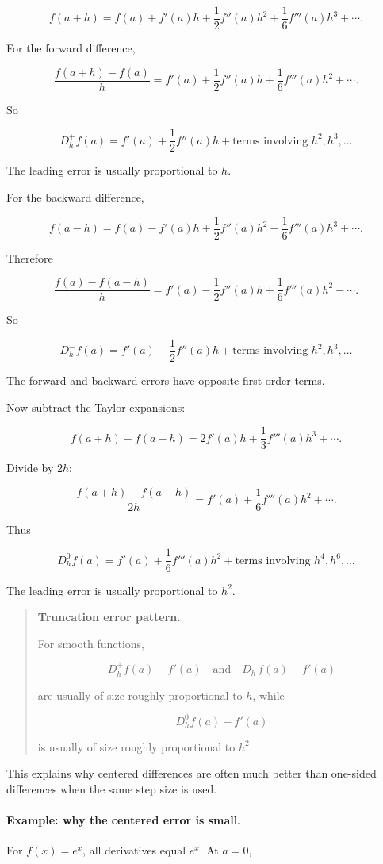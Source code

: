 \[
f(a+h)
=
f(a)+f'(a)h+\frac12f''(a)h^2+\frac16f'''(a)h^3+\cdots.
\]

For the forward difference,

\[
\frac{f(a+h)-f(a)}{h}
=
f'(a)+\frac12f''(a)h+\frac16f'''(a)h^2+\cdots.
\]

So

\[
\boxed{
D_h^+f(a)=f'(a)+\frac12f''(a)h+\text{terms involving }h^2,h^3,\ldots
}
\]

The leading error is usually proportional to \(h\).

For the backward difference,

\[
f(a-h)
=
f(a)-f'(a)h+\frac12f''(a)h^2-\frac16f'''(a)h^3+\cdots.
\]

Therefore

\[
\frac{f(a)-f(a-h)}{h}
=
f'(a)-\frac12f''(a)h+\frac16f'''(a)h^2-\cdots.
\]

So

\[
\boxed{
D_h^-f(a)=f'(a)-\frac12f''(a)h+\text{terms involving }h^2,h^3,\ldots
}
\]

The forward and backward errors have opposite first-order terms.

Now subtract the Taylor expansions:

\[
f(a+h)-f(a-h)
=
2f'(a)h+\frac13f'''(a)h^3+\cdots.
\]

Divide by \(2h\):

\[
\frac{f(a+h)-f(a-h)}{2h}
=
f'(a)+\frac16f'''(a)h^2+\cdots.
\]

Thus

\[
\boxed{
D_h^0f(a)=f'(a)+\frac16f'''(a)h^2+\text{terms involving }h^4,h^6,\ldots
}
\]

The leading error is usually proportional to \(h^2\).

\begin{quote}
\textbf{Truncation error pattern.}

For smooth functions,

\[
D_h^+f(a)-f'(a)
\quad\text{and}\quad
D_h^-f(a)-f'(a)
\]

are usually of size roughly proportional to \(h\), while

\[
D_h^0f(a)-f'(a)
\]

is usually of size roughly proportional to \(h^2\).
\end{quote}

This explains why centered differences are often much better than one-sided differences
when the same step size is used.

\paragraph{Example: why the centered error is small.}
For \(f(x)=e^x\), all derivatives equal \(e^x\).  At \(a=0\),

